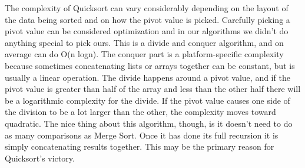 
The complexity of Quicksort can vary considerably depending on the layout of the
data being sorted and on how the pivot value is picked. Carefully picking a
pivot value can be considered optimization and in our algorithms we didn't do
anything special to pick ours. This is a divide and conquer algorithm, and on
average can do O(n logn). The conquer part is a platform-specific complexity
because sometimes concatenating lists or arrays together can be constant, but is
usually a linear operation. The divide happens around a pivot value, and if the
pivot value is greater than half of the array and less than the other half there
will be a logarithmic complexity for the divide. If the pivot value causes one
side of the division to be a lot larger than the other, the complexity moves
toward quadratic. The nice thing about this algorithm, though, is it doesn't
need to do as many comparisons as Merge Sort. Once it has done its full
recursion it is simply concatenating results together. This may be the primary
reason for Quicksort's victory.
